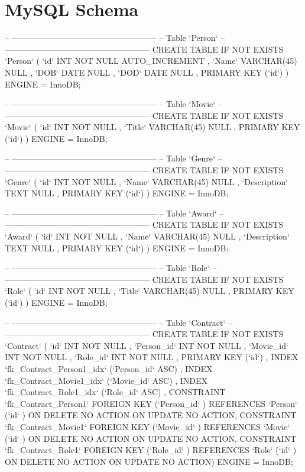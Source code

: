 \section{MySQL Schema}
\begin{spverbatim}
-- -----------------------------------------------------
-- Table `Person`
-- -----------------------------------------------------
CREATE  TABLE IF NOT EXISTS `Person` (
  `id` INT NOT NULL AUTO_INCREMENT ,
  `Name` VARCHAR(45) NULL ,
  `DOB` DATE NULL ,
  `DOD` DATE NULL ,
  PRIMARY KEY (`id`) )
ENGINE = InnoDB;


-- -----------------------------------------------------
-- Table `Movie`
-- -----------------------------------------------------
CREATE  TABLE IF NOT EXISTS `Movie` (
  `id` INT NOT NULL ,
  `Title` VARCHAR(45) NULL ,
  PRIMARY KEY (`id`) )
ENGINE = InnoDB;


-- -----------------------------------------------------
-- Table `Genre`
-- -----------------------------------------------------
CREATE  TABLE IF NOT EXISTS `Genre` (
  `id` INT NOT NULL ,
  `Name` VARCHAR(45) NULL ,
  `Description` TEXT NULL ,
  PRIMARY KEY (`id`) )
ENGINE = InnoDB;


-- -----------------------------------------------------
-- Table `Award`
-- -----------------------------------------------------
CREATE  TABLE IF NOT EXISTS `Award` (
  `id` INT NOT NULL ,
  `Name` VARCHAR(45) NULL ,
  `Description` TEXT NULL ,
  PRIMARY KEY (`id`) )
ENGINE = InnoDB;


-- -----------------------------------------------------
-- Table `Role`
-- -----------------------------------------------------
CREATE  TABLE IF NOT EXISTS `Role` (
  `id` INT NOT NULL ,
  `Title` VARCHAR(45) NULL ,
  PRIMARY KEY (`id`) )
ENGINE = InnoDB;


-- -----------------------------------------------------
-- Table `Contract`
-- -----------------------------------------------------
CREATE  TABLE IF NOT EXISTS `Contract` (
  `id` INT NOT NULL ,
  `Person_id` INT NOT NULL ,
  `Movie_id` INT NOT NULL ,
  `Role_id` INT NOT NULL ,
  PRIMARY KEY (`id`) ,
  INDEX `fk_Contract_Person1_idx` (`Person_id` ASC) ,
  INDEX `fk_Contract_Movie1_idx` (`Movie_id` ASC) ,
  INDEX `fk_Contract_Role1_idx` (`Role_id` ASC) ,
  CONSTRAINT `fk_Contract_Person1`
    FOREIGN KEY (`Person_id` )
    REFERENCES `Person` (`id` )
    ON DELETE NO ACTION
    ON UPDATE NO ACTION,
  CONSTRAINT `fk_Contract_Movie1`
    FOREIGN KEY (`Movie_id` )
    REFERENCES `Movie` (`id` )
    ON DELETE NO ACTION
    ON UPDATE NO ACTION,
  CONSTRAINT `fk_Contract_Role1`
    FOREIGN KEY (`Role_id` )
    REFERENCES `Role` (`id` )
    ON DELETE NO ACTION
    ON UPDATE NO ACTION)
ENGINE = InnoDB;



\end{spverbatim}
